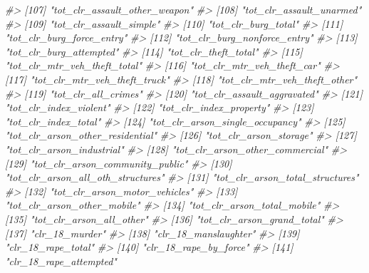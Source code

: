 \documentclass[
]{krantz}
\makeatletter
\newenvironment{Shaded}{\begin{snugshade}}{\end{snugshade}}
\newcommand{\CommentTok}[1]{\textcolor[rgb]{0.37,0.37,0.37}{\textit{#1}}}
\newenvironment{kframe}{%
\medskip{}
\setlength{\fboxsep}{.8em}
 \def\at@end@of@kframe{}%
 \ifinner\ifhmode%
  \def\at@end@of@kframe{\end{minipage}}%
  \begin{minipage}{\columnwidth}%
 \fi\fi%
 \def\FrameCommand##1{\hskip\@totalleftmargin \hskip-\fboxsep
 \colorbox{shadecolor}{##1}\hskip-\fboxsep
     \hskip-\linewidth \hskip-\@totalleftmargin \hskip\columnwidth}%
 \MakeFramed {\advance\hsize-\width
   \@totalleftmargin\z@ \linewidth\hsize
   \@setminipage}}%
 {\par\unskip\endMakeFramed%
 \at@end@of@kframe}
\renewenvironment{Shaded}{\begin{kframe}}{\end{kframe}}
\makeatother
\begin{document}
\begin{Shaded}
\begin{Highlighting}[]
\CommentTok{\#\textgreater{} [107] "tot\_clr\_assault\_other\_weapon"    }
\CommentTok{\#\textgreater{} [108] "tot\_clr\_assault\_unarmed"         }
\CommentTok{\#\textgreater{} [109] "tot\_clr\_assault\_simple"          }
\CommentTok{\#\textgreater{} [110] "tot\_clr\_burg\_total"              }
\CommentTok{\#\textgreater{} [111] "tot\_clr\_burg\_force\_entry"        }
\CommentTok{\#\textgreater{} [112] "tot\_clr\_burg\_nonforce\_entry"     }
\CommentTok{\#\textgreater{} [113] "tot\_clr\_burg\_attempted"          }
\CommentTok{\#\textgreater{} [114] "tot\_clr\_theft\_total"             }
\CommentTok{\#\textgreater{} [115] "tot\_clr\_mtr\_veh\_theft\_total"     }
\CommentTok{\#\textgreater{} [116] "tot\_clr\_mtr\_veh\_theft\_car"       }
\CommentTok{\#\textgreater{} [117] "tot\_clr\_mtr\_veh\_theft\_truck"     }
\CommentTok{\#\textgreater{} [118] "tot\_clr\_mtr\_veh\_theft\_other"     }
\CommentTok{\#\textgreater{} [119] "tot\_clr\_all\_crimes"              }
\CommentTok{\#\textgreater{} [120] "tot\_clr\_assault\_aggravated"      }
\CommentTok{\#\textgreater{} [121] "tot\_clr\_index\_violent"           }
\CommentTok{\#\textgreater{} [122] "tot\_clr\_index\_property"          }
\CommentTok{\#\textgreater{} [123] "tot\_clr\_index\_total"             }
\CommentTok{\#\textgreater{} [124] "tot\_clr\_arson\_single\_occupancy"  }
\CommentTok{\#\textgreater{} [125] "tot\_clr\_arson\_other\_residential" }
\CommentTok{\#\textgreater{} [126] "tot\_clr\_arson\_storage"           }
\CommentTok{\#\textgreater{} [127] "tot\_clr\_arson\_industrial"        }
\CommentTok{\#\textgreater{} [128] "tot\_clr\_arson\_other\_commercial"  }
\CommentTok{\#\textgreater{} [129] "tot\_clr\_arson\_community\_public"  }
\CommentTok{\#\textgreater{} [130] "tot\_clr\_arson\_all\_oth\_structures"}
\CommentTok{\#\textgreater{} [131] "tot\_clr\_arson\_total\_structures"  }
\CommentTok{\#\textgreater{} [132] "tot\_clr\_arson\_motor\_vehicles"    }
\CommentTok{\#\textgreater{} [133] "tot\_clr\_arson\_other\_mobile"      }
\CommentTok{\#\textgreater{} [134] "tot\_clr\_arson\_total\_mobile"      }
\CommentTok{\#\textgreater{} [135] "tot\_clr\_arson\_all\_other"         }
\CommentTok{\#\textgreater{} [136] "tot\_clr\_arson\_grand\_total"       }
\CommentTok{\#\textgreater{} [137] "clr\_18\_murder"                   }
\CommentTok{\#\textgreater{} [138] "clr\_18\_manslaughter"             }
\CommentTok{\#\textgreater{} [139] "clr\_18\_rape\_total"               }
\CommentTok{\#\textgreater{} [140] "clr\_18\_rape\_by\_force"            }
\CommentTok{\#\textgreater{} [141] "clr\_18\_rape\_attempted"           }

\end{Highlighting}
\end{Shaded}
\end{document}
